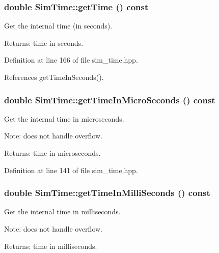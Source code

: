 \subsubsection{\setlength{\rightskip}{0pt plus 5cm}double Sim\-Time::get\-Time () const\hspace{0.3cm}{\tt  [inline]}}\label{classSimTime_962f03a0482fc73f32976f94ef91e844}


Get the internal time (in seconds). 

\begin{Desc}
\item[Returns:]time in seconds. \end{Desc}


Definition at line 166 of file sim\_\-time.hpp.

References get\-Time\-In\-Seconds().
\subsubsection{\setlength{\rightskip}{0pt plus 5cm}double Sim\-Time::get\-Time\-In\-Micro\-Seconds () const\hspace{0.3cm}{\tt  [inline]}}\label{classSimTime_6fc5712331fdd39a3f5cac85830afb5c}


Get the internal time in microseconds. 

Note: does not handle overflow. \begin{Desc}
\item[Returns:]time in microseconds. \end{Desc}


Definition at line 141 of file sim\_\-time.hpp.
\subsubsection{\setlength{\rightskip}{0pt plus 5cm}double Sim\-Time::get\-Time\-In\-Milli\-Seconds () const\hspace{0.3cm}{\tt  [inline]}}\label{classSimTime_9ffa677730083f5ef0fc74bbbc0f3237}


Get the internal time in milliseconds. 

Note: does not handle overflow. \begin{Desc}
\item[Returns:]time in milliseconds. \end{Desc}


